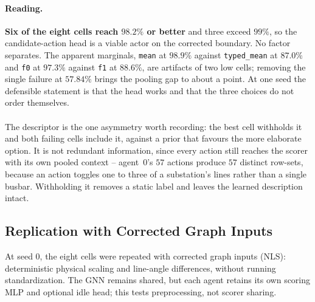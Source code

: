 \paragraph{Reading.}
\textbf{Six of the eight cells reach $98.2\%$ or better} and three exceed
$99\%$, so the candidate-action head is a viable actor on the corrected
boundary. No factor separates. The apparent marginals, \texttt{mean} at
$98.9\%$ against \texttt{typed\_mean} at $87.0\%$ and \texttt{f0} at $97.3\%$
against \texttt{f1} at $88.6\%$, are artifacts of two low cells; removing the
single failure at $57.84\%$ brings the pooling gap to about a point. At one seed
the defensible statement is that the head works and that the three choices do
not order themselves.
\\
\\
The descriptor is the one asymmetry worth recording: the best cell withholds it
and both failing cells include it, against a prior that favours the more
elaborate option. It is not redundant information, since every action still
reaches the scorer with its own pooled context -- agent~$0$'s $57$ actions
produce $57$ distinct row-sets, because an action toggles one to three of a
substation's lines rather than a single busbar. Withholding it removes a static
label and leaves the learned description intact.

\subsection{Replication with Corrected Graph Inputs}
\label{sec:screen-e-nls}

At seed 0, the eight cells were repeated with corrected graph inputs (NLS):
deterministic physical scaling and line-angle differences, without running
standardization. The GNN remains shared, but each agent retains its own scoring
MLP and optional idle head; this tests preprocessing, not scorer sharing.

